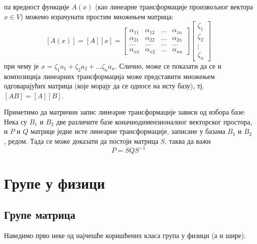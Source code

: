 \documentclass{report}
\theoremstyle{plain}
\theoremstyle{definition}
\begin{document}
па вредност функције $A(x)$ (као линеарне трансформације произвољног вектора $x\in V$) можемо израчунати простим множењем матрица:
$$[A(x)] = [A][x] = \begin{bmatrix}
            \alpha_{11} & \alpha_{12} & ... & \alpha_{1n} \\
            \alpha_{21} & \alpha_{22} & ... & \alpha_{2n} \\
            ... & ... & ... & ... \\
            \alpha_{n1} & \alpha_{n2} & ... & \alpha_{nn}
           \end{bmatrix}
           \begin{bmatrix}
           \zeta_1\\
           \zeta_2\\
           \vdots \\
           \zeta_n
           \end{bmatrix}
$$
при чему је $x = \zeta_1 a_1 + \zeta_2 a_2 + ... \zeta_n a_n$. Слично, може се показати да се и композиција линеарних трансформација може представити множењем одговарајућих матрица (које морају да се односе на исту базу), тј. $[AB] = [A][B]$.

Приметимо да матрични запис линеарне трансформације зависи од избора базе:\\
Нека су $B_1$ и $B_2$ две различите базе коначнодимензионалног векторског простора, и $P$ и $Q$ матрице једне исте линеарне трансформације, записане у базама $B_1$ и $B_2$, редом. Тада се може доказати да постоји матрица $S$, таква да важи
$$P = SQS^{-1}$$

\chapter{Групе у физици}

\section{Групе матрица}

Наведимо прво неке од најчешће коришћених класа група у физици (а и шире):
\end{document}
